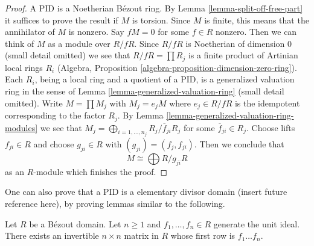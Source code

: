 \begin{proof}
A PID is a Noetherian B\'ezout ring. By Lemma \ref{lemma-split-off-free-part}
it suffices to prove the result if $M$ is torsion. Since $M$ is finite, this
means that the annihilator of $M$ is nonzero. Say $fM = 0$ for some
$f \in R$ nonzero. Then we can think of $M$ as a module over $R/fR$.
Since $R/fR$ is Noetherian of dimension $0$ (small detail omitted)
we see that $R/fR = \prod R_j$ is a finite product of Artinian
local rings $R_i$
(Algebra, Proposition \ref{algebra-proposition-dimension-zero-ring}).
Each $R_i$, being a local ring and a quotient of a PID, is a generalized
valuation ring in the sense of
Lemma \ref{lemma-generalized-valuation-ring} (small detail omitted).
Write $M = \prod M_j$ with $M_j = e_j M$ where $e_j \in R/fR$ is
the idempotent corresponding to the factor $R_j$.
By Lemma \ref{lemma-generalized-valuation-ring-modules}
we see that $M_j = \bigoplus_{i = 1, \ldots, n_j} R_j/\overline{f}_{ji}R_j$
for some $\overline{f}_{ji} \in R_j$. Choose lifts $f_{ji} \in R$
and choose $g_{ji} \in R$ with $(g_{ji}) = (f_j, f_{ji})$.
Then we conclude that
$$
M \cong \bigoplus R/g_{ji}R
$$
as an $R$-module which finishes the proof.
\end{proof}

\noindent
One can also prove that a PID is a elementary divisor domain (insert future
reference here), by proving lemmas similar to the following.

\begin{lemma}
\label{lemma-unimodular-vector}
Let $R$ be a B\'ezout domain. Let $n \geq 1$ and $f_1, \ldots, f_n \in R$
generate the unit ideal. There exists an invertible $n \times n$ matrix in
$R$ whose first row is $f_1 \ldots f_n$.
\end{lemma}

